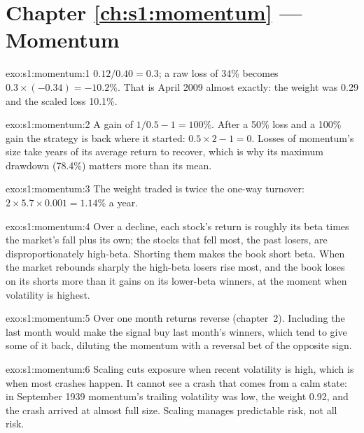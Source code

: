\section*{Chapter \ref{ch:s1:momentum} --- Momentum}

\begin{solution}{exo:s1:momentum:1}
$0.12/0.40 = 0.3$; a raw loss of 34\% becomes $0.3 \times (-0.34) = -10.2\%$. That is April 2009 almost exactly: the weight was 0.29 and the scaled loss 10.1\%.
\end{solution}

\begin{solution}{exo:s1:momentum:2}
A gain of $1/0.5 - 1 = 100\%$. After a 50\% loss and a 100\% gain the strategy is back where it started: $0.5 \times 2 - 1 = 0$. Losses of momentum's size
take years of its average return to recover, which is why its maximum drawdown (78.4\%) matters more than its mean.
\end{solution}

\begin{solution}{exo:s1:momentum:3}
The weight traded is twice the one-way turnover: $2 \times 5.7 \times 0.001 = 1.14\%$ a year.
\end{solution}

\begin{solution}{exo:s1:momentum:4}
Over a decline, each stock's return is roughly its beta times the market's fall plus its own; the stocks that fell most, the past losers, are
disproportionately high-beta. Shorting them makes the book short beta. When the market rebounds sharply the high-beta losers rise most, and the book loses
on its shorts more than it gains on its lower-beta winners, at the moment when volatility is highest.
\end{solution}

\begin{solution}{exo:s1:momentum:5}
Over one month returns reverse (chapter~2). Including the last month would make the signal buy last month's winners, which tend to give some of it back,
diluting the momentum with a reversal bet of the opposite sign.
\end{solution}

\begin{solution}{exo:s1:momentum:6}
Scaling cuts exposure when recent volatility is high, which is when most crashes happen. It cannot see a crash that comes from a calm state: in September
1939 momentum's trailing volatility was low, the weight 0.92, and the crash arrived at almost full size. Scaling manages predictable risk, not all risk.
\end{solution}

